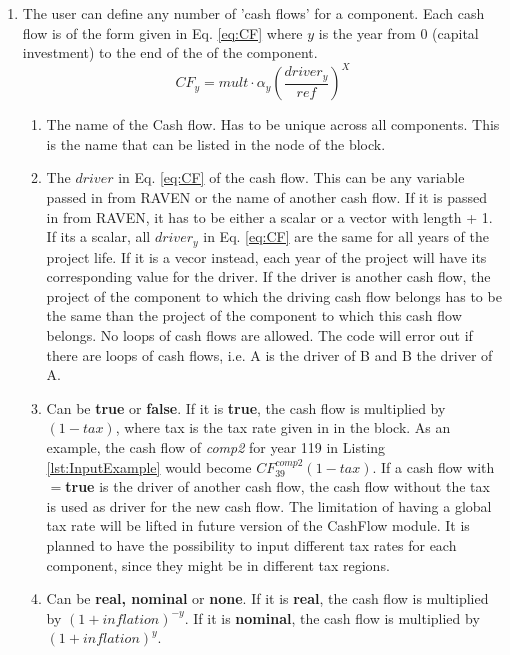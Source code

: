 \begin{enumerate}
\item[\xmlNode{CashFlow}] The user can define any number of 'cash flows' for a component. Each cash flow is of the form given in Eq. \ref{eq:CF} where $y$ is the
 year from 0 (capital investment) to the end of the  of the component.
\begin{equation}\label{eq:CF}
CF_{y}=mult\cdot\alpha_{y}\left ( \frac{driver_{y}}{ref} \right )^{X}
\end{equation}

  \begin{enumerate}
  \item[\xmlAttr{name}] The name of the Cash flow. Has to be unique across all components. This is the name that can be listed in the  node of the  block.
  \item[\xmlAttr{driver}] The $driver$ in Eq. \ref{eq:CF} of the cash flow. This can be any variable passed in from RAVEN or the name of another cash flow. If it is passed in from RAVEN, it has to be either a scalar or a vector with length  + 1. If its a scalar, all $driver_{y}$ in Eq. \ref{eq:CF}  are the same for all years of the project life. If it is a vecor instead, each year of the project  will have its corresponding value for the driver. If the driver is another
 cash flow, the project  of the component to which the driving cash flow belongs has to be the same than the project  of the component to which this
 cash flow belongs. No loops of cash flows are allowed. The code will error out if there are loops of cash flows, i.e. A is the driver of B and B the driver of A.
  \item[\xmlAttr{tax}] Can be \textbf{true} or \textbf{false}. If it is \textbf{true}, the cash flow is multiplied by $(1-tax)$, where tax is the tax rate given in  in the 
 block. As an example, the cash flow of \textit{comp2} for year 119 in Listing \ref{lst:InputExample} would become $CF^{comp2}_{39}(1-tax)$.  If a cash flow with $=$\textbf{true} is the driver of another cash flow, the cash flow without the tax is used as driver for the new cash flow. 
The limitation of having a global tax rate will be lifted in future version of the CashFlow module. It is planned to have the possibility to input different tax rates for each component, since they might be in different tax regions.
  \item[\xmlAttr{inflation}] Can be \textbf{real, nominal} or \textbf{none}. If it is \textbf{real}, the cash flow is multiplied by $(1+inflation)^{-y}$. If it is \textbf{nominal}, the cash flow is multiplied by $(1+inflation)^y$. 

\end{enumerate}
\end{enumerate}
